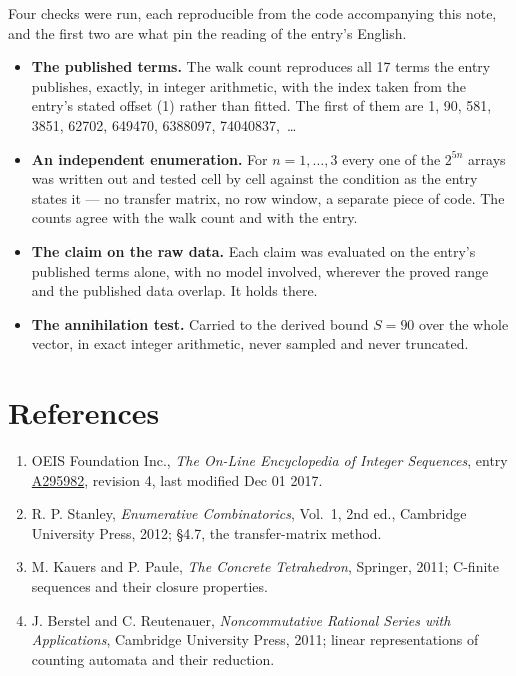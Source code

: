 \documentclass[11pt]{article}
\theoremstyle{definition}
\begin{document}
Four checks were run, each reproducible from the code accompanying this note, and the first two are what pin the reading of the entry's English.

\begin{itemize}

\item {\bfseries The published terms.} The walk count reproduces all 17 terms the entry publishes, exactly, in integer arithmetic, with the index taken from the entry's stated offset (1) rather than fitted. The first of them are 1, 90, 581, 3851, 62702, 649470, 6388097, 74040837,~\dots

\item {\bfseries An independent enumeration.} For $n = 1,\dots,3$ every one of the $2^{5n}$ arrays was written out and tested cell by cell against the condition as the entry states it --- no transfer matrix, no row window, a separate piece of code. The counts agree with the walk count and with the entry.

\item {\bfseries The claim on the raw data.} Each claim was evaluated on the entry's published terms alone, with no model involved, wherever the proved range and the published data overlap. It holds there.

\item {\bfseries The annihilation test.} Carried to the derived bound $S = 90$ over the whole vector, in exact integer arithmetic, never sampled and never truncated.

\end{itemize}

\section{References}

\begin{enumerate}

\item OEIS Foundation Inc., \emph{The On-Line Encyclopedia of Integer Sequences}, entry \href{https://oeis.org/A295982}{A295982}, revision 4, last modified Dec 01 2017.

\item R. P. Stanley, \emph{Enumerative Combinatorics}, Vol.~1, 2nd ed., Cambridge University Press, 2012; \S4.7, the transfer-matrix method.

\item M. Kauers and P. Paule, \emph{The Concrete Tetrahedron}, Springer, 2011; C-finite sequences and their closure properties.

\item J. Berstel and C. Reutenauer, \emph{Noncommutative Rational Series with Applications}, Cambridge University Press, 2011; linear representations of counting automata and their reduction.

\end{enumerate}
\end{document}
